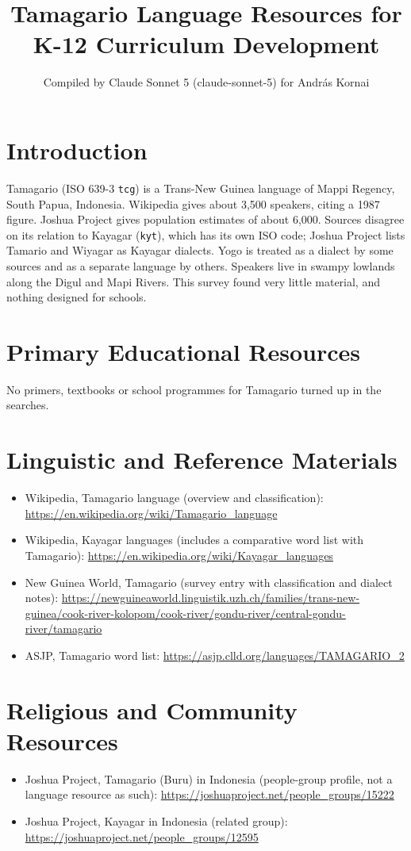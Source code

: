 \documentclass[12pt]{article}
\title{Tamagario Language Resources for K-12 Curriculum Development}
\author{Compiled by Claude Sonnet 5 (claude-sonnet-5) for Andr\'as Kornai}
\date{}
\begin{document}
\maketitle

\section{Introduction}
Tamagario (ISO 639-3 \texttt{tcg}) is a Trans-New Guinea language of Mappi Regency, South Papua, Indonesia. Wikipedia gives about 3,500 speakers, citing a 1987 figure. Joshua Project gives population estimates of about 6,000. Sources disagree on its relation to Kayagar (\texttt{kyt}), which has its own ISO code; Joshua Project lists Tamario and Wiyagar as Kayagar dialects. Yogo is treated as a dialect by some sources and as a separate language by others. Speakers live in swampy lowlands along the Digul and Mapi Rivers. This survey found very little material, and nothing designed for schools.

\section{Primary Educational Resources}
No primers, textbooks or school programmes for Tamagario turned up in the searches.

\section{Linguistic and Reference Materials}
\begin{itemize}
\item Wikipedia, Tamagario language (overview and classification): \url{https://en.wikipedia.org/wiki/Tamagario_language}
\item Wikipedia, Kayagar languages (includes a comparative word list with Tamagario): \url{https://en.wikipedia.org/wiki/Kayagar_languages}
\item New Guinea World, Tamagario (survey entry with classification and dialect notes): \url{https://newguineaworld.linguistik.uzh.ch/families/trans-new-guinea/cook-river-kolopom/cook-river/gondu-river/central-gondu-river/tamagario}
\item ASJP, Tamagario word list: \url{https://asjp.clld.org/languages/TAMAGARIO_2}
\end{itemize}

\section{Religious and Community Resources}
\begin{itemize}
\item Joshua Project, Tamagario (Buru) in Indonesia (people-group profile, not a language resource as such): \url{https://joshuaproject.net/people_groups/15222}
\item Joshua Project, Kayagar in Indonesia (related group): \url{https://joshuaproject.net/people_groups/12595}
\end{itemize}
\end{document}
